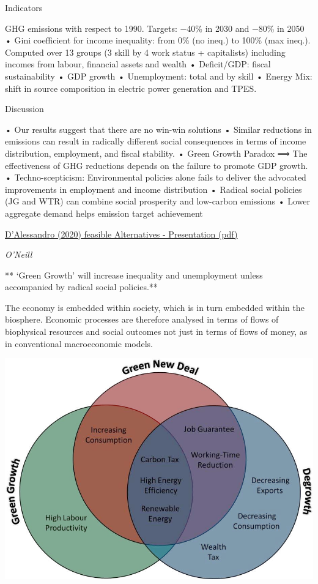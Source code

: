 \documentclass[
]{book}
\begin{document}
Indicators

GHG emissions with respect to 1990. Targets: −40\% in 2030
and −80\% in 2050
• Gini coefficient for income inequality: from 0\% (no ineq.) to
100\% (max ineq.). Computed over 13 groups (3 skill by 4
work status + capitalists) including incomes from labour,
financial assets and wealth
• Deficit/GDP: fiscal sustainability
• GDP growth
• Unemployment: total and by skill
• Energy Mix: shift in source composition in electric power
generation and TPES.

Discussion

• Our results suggest that there are no win-win solutions
• Similar reductions in emissions can result in radically different
social consequences in terms of income distribution,
employment, and fiscal stability.
• Green Growth Paradox ⟹ The effectiveness of GHG reductions
depends on the failure to promote GDP growth.
• Techno-scepticism: Environmental policies alone fails to deliver
the advocated improvements in employment and income
distribution
• Radical social policies (JG and WTR) can combine social
prosperity and low-carbon emissions
• Lower aggregate demand helps emission target achievement

\href{pdf/Feasible_Alternatives.pdf}{D'Alessandro (2020) feasible Alternatives - Presentation (pdf)}

\emph{O'Neill}

** `Green Growth' will increase inequality and unemployment unless accompanied by radical social policies.**

The economy is embedded within society, which is
in turn embedded within the biosphere. Economic processes are therefore analysed in terms of
flows of biophysical resources and social outcomes not just in terms of flows of money, as in
conventional macroeconomic models.

\includegraphics{fig/green_policy_packages.png}
\end{document}
